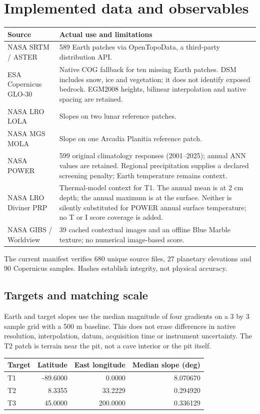 \documentclass[10pt,a4paper]{article}
\begin{document}
\section{Implemented data and observables}
\begin{longtable}{p{3.2cm}p{11.3cm}}
\toprule Source & Actual use and limitations\\\midrule
NASA SRTM / ASTER & 589 Earth patches via OpenTopoData, a third-party distribution API.\\
ESA Copernicus GLO-30 & Native COG fallback for ten missing Earth patches. DSM includes snow, ice and vegetation; it does not identify exposed bedrock. EGM2008 heights, bilinear interpolation and native spacing are retained.\\
NASA LRO LOLA & Slopes on two lunar reference patches.\\
NASA MGS MOLA & Slope on one Arcadia Planitia reference patch.\\
NASA POWER & 599 original climatology responses (2001--2025); annual ANN values are retained. Regional precipitation supplies a declared screening penalty; Earth temperature remains context.\\
NASA LRO Diviner PRP & Thermal-model context for T1. The annual mean is at 2 cm depth; the annual maximum is at the surface. Neither is silently substituted for POWER annual surface temperature; no T or I score coverage is added.\\
NASA GIBS / Worldview & 39 cached contextual images and an offline Blue Marble texture; no numerical image-based score.\\
\bottomrule\end{longtable}
The current manifest verifies 680 unique source files, 27 planetary elevations and 90 Copernicus samples. Hashes establish integrity, not physical accuracy.
\subsection{Targets and matching scale}
Earth and target slopes use the median magnitude of four gradients on a 3 by 3
sample grid with a 500 m baseline. This does not erase differences in native
resolution, interpolation, datum, acquisition time or instrument uncertainty.
The T2 patch is terrain near the pit, not a cave interior or the pit itself.
\begin{center}\begin{tabular}{lrrr}\toprule Target & Latitude & East longitude & Median slope (deg)\\\midrule
T1 & -89.6000 & 0.0000 & 8.070670 \\
T2 & 8.3355 & 33.2229 & 0.294920 \\
T3 & 45.0000 & 200.0000 & 0.336129 \\
\bottomrule\end{tabular}\end{center}
\end{document}
